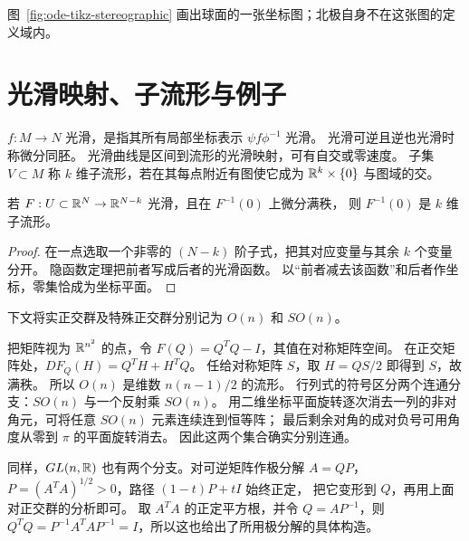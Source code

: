 图~\ref{fig:ode-tikz-stereographic} 画出球面的一张坐标图；北极自身不在这张图的定义域内。
\begin{center}
\begin{minipage}{0.96\linewidth}
\centering
\label{fig:ode-tikz-stereographic}
\end{minipage}
\end{center}

\section{光滑映射、子流形与例子}
\begin{definition}
$f:M\to N$ 光滑，是指其所有局部坐标表示 $\psi f\phi^{-1}$ 光滑。
光滑可逆且逆也光滑时称微分同胚。
光滑曲线是区间到流形的光滑映射，可有自交或零速度。
子集 $V\subset M$ 称 $k$ 维子流形，若在其每点附近有图使它成为
$\mathbb{R}^k\times\{0\}$ 与图域的交。
\end{definition}
\begin{proposition}[正则方程定义子流形]
若 $F:U\subset\mathbb{R}^N\to\mathbb{R}^{N-k}$ 光滑，且在 $F^{-1}(0)$ 上微分满秩，
则 $F^{-1}(0)$ 是 $k$ 维子流形。
\end{proposition}
\begin{proof}
在一点选取一个非零的 $(N-k)$ 阶子式，把其对应变量与其余 $k$ 个变量分开。
隐函数定理把前者写成后者的光滑函数。
以“前者减去该函数”和后者作坐标，零集恰成为坐标平面。
\end{proof}
下文将实正交群及特殊正交群分别记为 $O(n)$ 和 $SO(n)$。
\begin{example}[正交群]
把矩阵视为 $\mathbb{R}^{n^2}$ 的点，令 $F(Q)=Q^TQ-I$，其值在对称矩阵空间。
在正交矩阵处，$DF_Q(H)=Q^TH+H^TQ$。
任给对称矩阵 $S$，取 $H=QS/2$ 即得到 $S$，故满秩。
所以 $O(n)$ 是维数 $n(n-1)/2$ 的流形。
行列式的符号区分两个连通分支：$SO(n)$ 与一个反射乘 $SO(n)$。
用二维坐标平面旋转逐次消去一列的非对角元，可将任意 $SO(n)$ 元素连续连到恒等阵；
最后剩余对角的成对负号可用角度从零到 $\pi$ 的平面旋转消去。
因此这两个集合确实分别连通。
\end{example}
同样，$GL(n,\mathbb{R})$ 也有两个分支。对可逆矩阵作极分解
$A=QP$，$P=(A^TA)^{1/2}>0$，路径 $(1-t)P+tI$ 始终正定，
把它变形到 $Q$，再用上面对正交群的分析即可。
取 $A^TA$ 的正定平方根，并令 $Q=AP^{-1}$，则
$Q^TQ=P^{-1}A^TAP^{-1}=I$，所以这也给出了所用极分解的具体构造。



